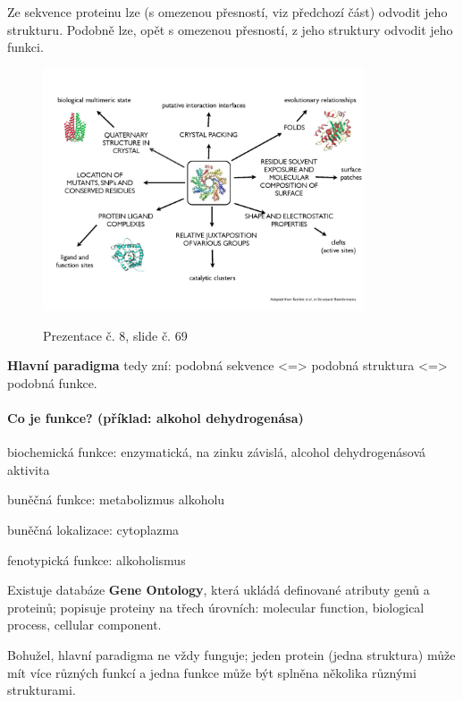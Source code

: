 \documentclass[DIV=8]{scrreprt}
\begin{document}
Ze sekvence proteinu lze (s omezenou přesností, viz předchozí část) odvodit jeho strukturu. Podobně lze, opět s omezenou přesností, z jeho struktury odvodit jeho funkci. \begin{figure}
    \caption{Prezentace č. 8, slide č. 69}
    \includegraphics[width=0.85\textwidth]{slides-8/slide-69.jpg}
    \centering
    \label{slides-8-slide-69}
\end{figure}


\textbf{Hlavní paradigma} tedy zní: podobná sekvence <=> podobná struktura <=> podobná funkce.

\paragraph{Co je funkce? (příklad: alkohol dehydrogenása)}
\begin{myItemize}[nosep]
    \item biochemická funkce: enzymatická, na zinku závislá, alcohol dehydrogenásová aktivita
    \item buněčná funkce: metabolizmus alkoholu
    \item buněčná lokalizace: cytoplazma
    \item fenotypická funkce: alkoholismus
\end{myItemize}



Existuje databáze \textbf{Gene Ontology}, která ukládá definované atributy genů a proteinů; popisuje proteiny na třech úrovních: molecular function, biological process, cellular component.

Bohužel, hlavní paradigma ne vždy funguje; jeden protein (jedna struktura) může mít více různých funkcí a jedna funkce může být splněna několika různými strukturami.
\end{document}
